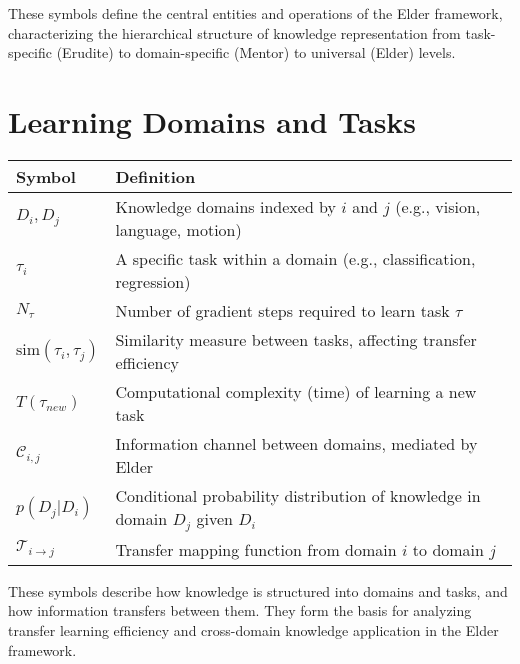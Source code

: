 \vspace{1cm}
\begin{center}
These symbols define the central entities and operations of the Elder framework, characterizing the hierarchical structure of knowledge representation from task-specific (Erudite) to domain-specific (Mentor) to universal (Elder) levels.
\end{center}

\clearpage
\chapter*{Learning Domains and Tasks}

\begin{center}
\begin{tabular}{>{\centering\arraybackslash}p{3cm} p{10cm}}
\hline
\textbf{Symbol} & \textbf{Definition} \\
\hline
$D_i, D_j$ & Knowledge domains indexed by $i$ and $j$ (e.g., vision, language, motion) \\
$\tau_i$ & A specific task within a domain (e.g., classification, regression) \\
$N_{\tau}$ & Number of gradient steps required to learn task $\tau$ \\
$\text{sim}(\tau_i, \tau_j)$ & Similarity measure between tasks, affecting transfer efficiency \\
$T(\tau_{new})$ & Computational complexity (time) of learning a new task \\
$\mathcal{C}_{i,j}$ & Information channel between domains, mediated by Elder \\
$p(D_j|D_i)$ & Conditional probability distribution of knowledge in domain $D_j$ given $D_i$ \\
$\mathcal{T}_{i \to j}$ & Transfer mapping function from domain $i$ to domain $j$ \\
\hline
\end{tabular}
\end{center}

\vspace{1cm}
\begin{center}
These symbols describe how knowledge is structured into domains and tasks, and how information transfers between them. They form the basis for analyzing transfer learning efficiency and cross-domain knowledge application in the Elder framework.
\end{center}

\clearpage
